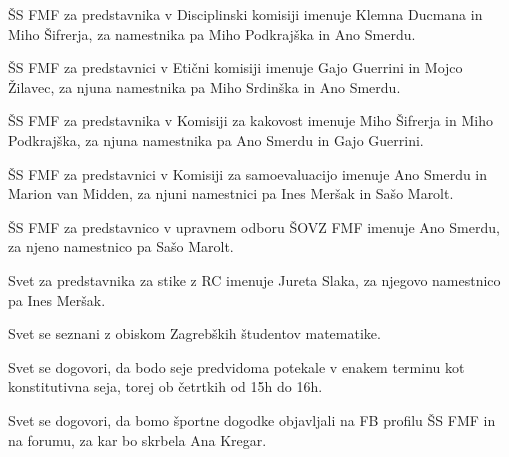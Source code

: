 \documentclass{seja}
\begin{document}
\begin{ad}
\begin{sklep*}
ŠS FMF za predstavnika v Disciplinski komisiji imenuje Klemna Ducmana in
Miho Šifrerja, za namestnika pa Miho Podkrajška in Ano Smerdu.
\end{sklep*}

\begin{sklep*}
ŠS FMF za predstavnici v Etični komisiji imenuje Gajo Guerrini in Mojco Žilavec, za njuna namestnika pa Miho Srdinška in Ano Smerdu.
\end{sklep*}

\begin{sklep*}
ŠS FMF za predstavnika  v Komisiji za kakovost imenuje Miho Šifrerja in Miho Podkrajška, za njuna namestnika pa Ano Smerdu in Gajo Guerrini.
\end{sklep*}

\begin{sklep*}
ŠS FMF za predstavnici v Komisiji za samoevaluacijo imenuje Ano Smerdu in Marion van Midden, za njuni namestnici pa Ines Meršak in Sašo Marolt.
\end{sklep*}

\begin{sklep*}
ŠS FMF za predstavnico v upravnem odboru ŠOVZ FMF imenuje Ano Smerdu, za njeno namestnico pa Sašo Marolt.
\end{sklep*}

Svet za predstavnika za stike z RC imenuje Jureta Slaka, za njegovo namestnico pa Ines Meršak.

\item
Svet se seznani z obiskom Zagrebških študentov matematike.

Svet se dogovori, da bodo seje predvidoma potekale v enakem terminu kot konstitutivna seja, torej ob četrtkih od 15h do 16h.

Svet se dogovori, da bomo športne dogodke objavljali na FB profilu ŠS FMF in na forumu, za kar bo skrbela Ana Kregar.
\end{ad}

\makeatletter \global\let\@enddocumenthook\@empty \makeatother
{}
\end{document}
